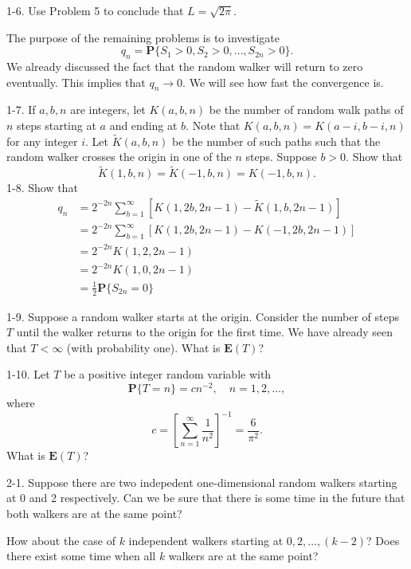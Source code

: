 \documentclass{stml-l}
\theoremstyle{definition}
\numberwithin{equation}{chapter}
\numberwithin{figure}{chapter}
\numberwithin{figure}{section}
\begin{document}
1-6. Use Problem 5 to conclude that $L=\sqrt{2\pi}$.

The purpose of the remaining problems is to investigate
\begin{equation*}
q_{n}=\mathbf{P}\{S_{1}>0,S_{2}>0,\ldots,S_{2n}>0\}.
\end{equation*}
We already discussed the fact that the random walker will return to
zero eventually. This implies that $q_{n}\rightarrow 0$. We will see
how fast the convergence is.

1-7. If $a,b,n$ are integers, let $K(a,b,n)$ be the number of random
walk paths of $n$ steps starting at $a$ and ending at $b$. Note that
$K(a,b,n)=K(a-i,b-i,n)$ for any integer $i$. Let $\tilde{K}(a,b,n)$
be the number of such paths such that the random walker crosses the
origin in one of the $n$ steps. Suppose $b>0$. Show that
\begin{equation*}
\tilde{K}(1,b,n)=\tilde{K}(-1,b,n)=K(-1,b,n).
\end{equation*}
1-8. Show that
\begin{align*}
q_{n} &=
2^{-2n}\sum\limits_{b=1}^{\infty}[K(1,2b,2n-1)-\tilde{K}(1,b,2n-1)]\\
&=2^{-2n}\sum\limits_{b=1}^{\infty}[K(1,2b,2n-1)-K(-1,2b,2n-1)]\\
&=2^{-2n}K(1,2,2n-1)\\
&=2^{-2n}K(1,0,2n-1)\\
&=\frac{1}{2}\mathbf{P}\{S_{2n}=0\}
\end{align*}

1-9. Suppose a random walker starts at the origin. Consider the
number of steps $T$ until the walker returns to the origin for the
first time. We have already seen that $ T<\infty$ (with probability
one). What is $\mathbf{E}(T)$?

1-10. Let $T$ be a positive integer random variable with
\begin{equation*}
\mathbf{P}\{T=n\}=cn^{-2},\quad n=1,2,\ldots,
\end{equation*}
where
\begin{equation*}
c=\left[\sum\limits_{n=1}^{\infty}\frac{1}{n^{2}}\right]^{-1}=\frac{6}{\pi^{2}}.
\end{equation*}
What is $\mathbf{E}(T)$?

2-1. Suppose there are two indepedent one-dimensional random walkers
starting at $0$ and 2 respectively. Can we be sure that there is
some time in the future that both walkers are at the same point?

How about the case of $k$ independent walkers starting at
$0,2,\ldots,(k-2)$? Does there exist some time when all $k$ walkers
are at the same point?
\end{document}
